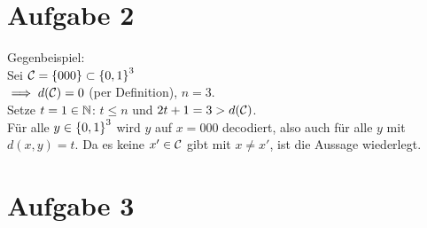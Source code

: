 \section*{Aufgabe 2}
Gegenbeispiel:\\
Sei $\mathcal{C} = \left\lbrace 000 \right\rbrace\subset\left\lbrace 0, 1 \right\rbrace^3$\\
$\implies d(\mathcal{C})=0$ (per Definition), $n=3$.\\
Setze $t=1\in\mathbb{N}$: $t\leq n$ und $2t+1=3>d(\mathcal{C})$.\\
Für alle $y\in \left\lbrace 0, 1 \right\rbrace^3$ wird $y$ auf $x=000$ decodiert, also auch für alle $y$ mit $d(x, y)=t$. Da es keine $x'\in\mathcal{C}$ gibt mit $x\not= x'$, ist die Aussage wiederlegt.

\section*{Aufgabe 3}
